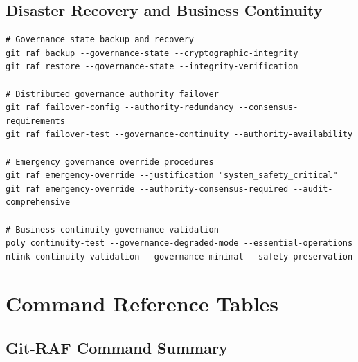 \documentclass[11pt,letterpaper]{article}
\begin{document}
\subsection{Disaster Recovery and Business Continuity}

\begin{lstlisting}[language=shell, caption=Disaster Recovery Commands]
# Governance state backup and recovery
git raf backup --governance-state --cryptographic-integrity
git raf restore --governance-state --integrity-verification

# Distributed governance authority failover
git raf failover-config --authority-redundancy --consensus-requirements
git raf failover-test --governance-continuity --authority-availability

# Emergency governance override procedures
git raf emergency-override --justification "system_safety_critical"
git raf emergency-override --authority-consensus-required --audit-comprehensive

# Business continuity governance validation
poly continuity-test --governance-degraded-mode --essential-operations
nlink continuity-validation --governance-minimal --safety-preservation
\end{lstlisting}

\section{Command Reference Tables}

\subsection{Git-RAF Command Summary}
\end{document}
